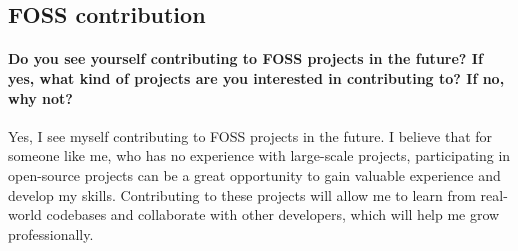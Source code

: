 \documentclass[11pt]{article}
\begin{document}
\subsection{FOSS contribution}
\paragraph{Do you see yourself contributing to FOSS projects in the future? If yes, what kind of
 projects are you interested in contributing to? If no, why not?\newline}

\noindent Yes, I see myself contributing to FOSS projects in the future. I believe that for someone like me, who has no experience with large-scale projects, participating in open-source projects can be a great opportunity to gain valuable experience and develop my skills. Contributing to these projects will allow me to learn from real-world codebases and collaborate with other developers, which will help me grow professionally.
\end{document}
